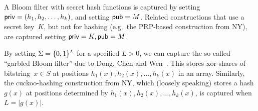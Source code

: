 A Bloom filter with secret hash functions is captured by setting
${\sf priv}=(h_1,h_2,\ldots,h_k)$, and setting ${\sf pub}=M$.
Related constructions that use a secret key~$K$, but not for hashing (e.g.\ the PRP-based
construction from NY), are captured setting ${\sf priv}=K, {\sf pub}=M$.

By setting $\Sigma=\{0,1\}^L$ for a specified $L>0$, we can capture
the so-called ``garbled Bloom filter'' due to Dong, Chen and
Wen~\cite{dong2013private}.  This stores
xor-shares of bitstring~$x \in S$ at positions
$h_1(x),h_2(x),\ldots,h_k(x)$ in an array. Similarly, the
cuckoo-hashing construction from NY, which (loosely speaking) stores
a hash $g(x)$ at positions determined by
$h_1(x),h_2(x),\ldots,h_k(x)$, is captured when $L=|g(x)|$.

